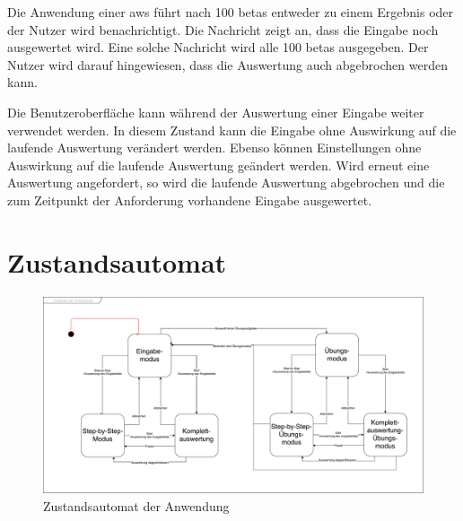 \documentclass[parskip=full,11pt,twoside]{scrartcl}
\begin{document}
Die Anwendung einer \gls{aws} führt nach 100 \glspl{beta} entweder zu einem Ergebnis oder der Nutzer wird benachrichtigt.
Die Nachricht zeigt an, dass die Eingabe noch ausgewertet wird.
Eine solche Nachricht wird alle 100 \glspl{beta} ausgegeben.
Der Nutzer wird darauf hingewiesen, dass die Auswertung auch abgebrochen werden kann.

Die Benutzeroberfläche kann während der Auswertung einer Eingabe weiter verwendet werden.
In diesem Zustand kann die Eingabe ohne Auswirkung auf die laufende Auswertung verändert werden.
Ebenso können Einstellungen ohne Auswirkung auf die laufende Auswertung geändert werden.
Wird erneut eine Auswertung angefordert, so wird die laufende Auswertung abgebrochen und die zum Zeitpunkt der Anforderung vorhandene Eingabe ausgewertet.

\section{Zustandsautomat}

\begin{figure}[H]
	\centering
	\includegraphics[width=\textwidth]{img/Zustandsautomat}
	\caption{\label{fig:state} Zustandsautomat der Anwendung}
\end{figure}
\end{document}
